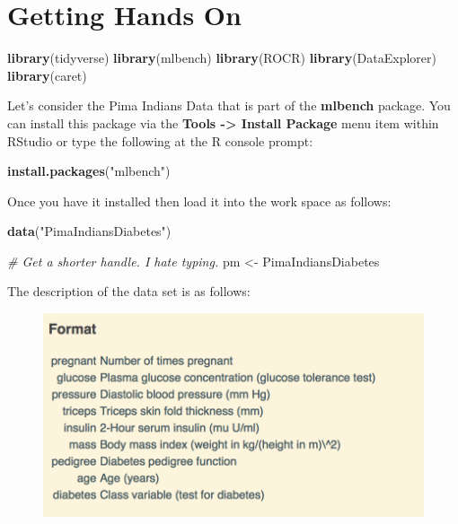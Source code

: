 \documentclass[]{book}
\newenvironment{Shaded}{\begin{snugshade}}{\end{snugshade}}
\newcommand{\KeywordTok}[1]{\textcolor[rgb]{0.13,0.29,0.53}{\textbf{#1}}}
\newcommand{\StringTok}[1]{\textcolor[rgb]{0.31,0.60,0.02}{#1}}
\newcommand{\CommentTok}[1]{\textcolor[rgb]{0.56,0.35,0.01}{\textit{#1}}}
\newcommand{\NormalTok}[1]{#1}
\begin{document}
\chapter{Getting Hands On}\label{getting-hands-on}

\begin{Shaded}
\begin{Highlighting}[]
\KeywordTok{library}\NormalTok{(tidyverse)}
\KeywordTok{library}\NormalTok{(mlbench)}
\KeywordTok{library}\NormalTok{(ROCR)}
\KeywordTok{library}\NormalTok{(DataExplorer)}
\KeywordTok{library}\NormalTok{(caret)}
\end{Highlighting}
\end{Shaded}

Let's consider the Pima Indians Data that is part of the
\textbf{mlbench} package. You can install this package via the
\textbf{Tools -\textgreater{} Install Package} menu item within RStudio
or type the following at the R console prompt:

\begin{Shaded}
\begin{Highlighting}[]
\KeywordTok{install.packages}\NormalTok{(}\StringTok{"mlbench"}\NormalTok{)}
\end{Highlighting}
\end{Shaded}

Once you have it installed then load it into the work space as follows:

\begin{Shaded}
\begin{Highlighting}[]
\KeywordTok{data}\NormalTok{(}\StringTok{"PimaIndiansDiabetes"}\NormalTok{)}

\CommentTok{# Get a shorter handle. I hate typing. }
\NormalTok{pm <-}\StringTok{ }\NormalTok{PimaIndiansDiabetes}
\end{Highlighting}
\end{Shaded}

The description of the data set is as follows:

\begin{figure}
\centering
\includegraphics[width=4.94792in]{./PICS/pima_desc.png}
\caption{}
\end{figure}
\end{document}
